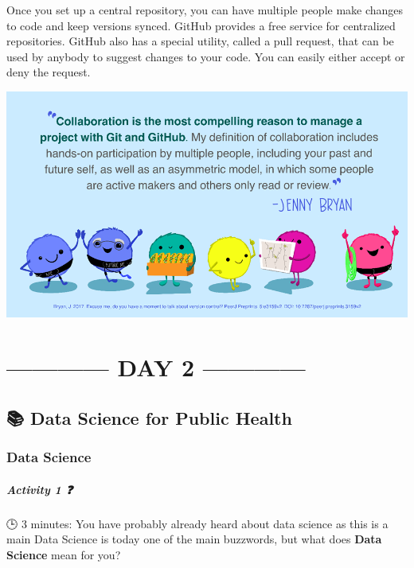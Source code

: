\documentclass[
  letterpaper,
  DIV=11,
  numbers=noendperiod]{scrreprt}
\begin{document}
Once you set up a central repository, you can have multiple people make
changes to code and keep versions synced. GitHub provides a free service
for centralized repositories. GitHub also has a special utility, called
a pull request, that can be used by anybody to suggest changes to your
code. You can easily either accept or deny the request.

\includegraphics{./images/paste-ADC9719C.png}

\part{------------ DAY 2 ------------}

\hypertarget{data-science-for-public-health}{%
\chapter{\texorpdfstring{{📚} Data Science for Public
Health}{📚 Data Science for Public Health}}\label{data-science-for-public-health}}

\hypertarget{data-science}{%
\section{Data Science}\label{data-science}}

\hypertarget{activity-1}{%
\subsubsection{\texorpdfstring{Activity 1
{❓}}{Activity 1 ❓}}\label{activity-1}}

{🕒} 3 minutes: You have probably already heard about data science as
this is a main Data Science is today one of the main buzzwords, but what
does \textbf{Data Science} mean for you?
\end{document}
